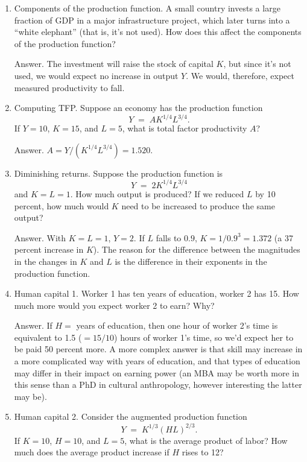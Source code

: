 \setlength{\leftmargini}{.5\oldleftmargini}
\begin{enumerate}

\item Components of the production function.  A small country invests a large fraction of GDP in a major
infrastructure project, which later turns into a ``white elephant''
(that is, it's not used).
How does this affect the components of the
production function?

Answer.
The investment will raise the stock of capital $K$,
but since it's not used, we would expect no increase in output $Y$.
We would, therefore, expect measured productivity to fall.

\item Computing TFP.  Suppose an economy has the production function
\[
    Y \;=\; A K^{1/4} L^{3/4} .
\]
If $ Y= 10$, $K=15$, and $L = 5$,
what is total factor productivity $A$?

Answer.  $ A = Y / (K^{1/4} L^{3/4}) = 1.520$.


\item Diminishing returns.  Suppose the production function is
\[
    Y \;=\; 2 K^{1/4} L^{3/4}
\]
and $K=L = 1$. How much output is produced? If we reduced $L$ by
10 percent, how much would $K$ need to be increased to produce the same
output?

Answer.  With $K=L=1$, $Y = 2$.
If $L$ falls to $0.9$, $K = 1/0.9^3 = 1.372$
(a 37 percent increase in $K$).
The reason for the difference between the magnitudes in the changes in
$K$ and $L$ is the difference in their exponents in the production function.


\item Human capital 1. Worker 1 has ten years of education, worker 2 has 15.  How much
more would you expect worker 2 to earn?  Why?

Answer.  If $H = $ years of education, then one hour of worker 2's
time is equivalent to 1.5 ($=15/10$) hours of worker 1's time, so
we'd expect her to be paid 50 percent more. A more complex answer is
that skill may increase in a more complicated way with years of
education, and that types of education may differ in their impact
on earning power (an MBA may be worth more in this sense than a
PhD in cultural anthropology, however interesting the latter may
be).

\item Human capital 2. Consider the augmented production function
\[
    Y \;=\;  K^{1/3} (HL)^{2/3} .
\]
If $K=10$, $H=10$, and $L=5$, what is the average product of labor?
How much does the average product increase if $H$ rises to 12?


\end{enumerate}
